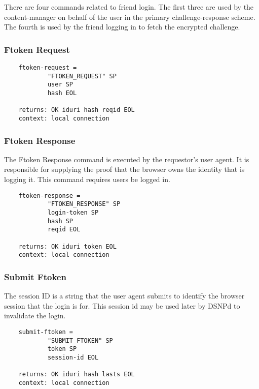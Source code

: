 \documentclass[letterpaper,11pt,oneside]{article}
\begin{document}
There are four commands related to friend login. The first three are used by
the content-manager on behalf of the user in the primary challenge-response
scheme. The fourth is used by the friend logging in to fetch the encrypted
challenge.

\subsubsection{Ftoken Request}

\vspace{10pt}
\begin{verbatim}
    ftoken-request = 
            "FTOKEN_REQUEST" SP 
            user SP 
            hash EOL 

    returns: OK iduri hash reqid EOL
    context: local connection
\end{verbatim}
\vspace{10pt}


\subsubsection{Ftoken Response}

The Ftoken Response command is executed by the requestor's user agent. It is
responsible for supplying the proof that the browser owns the identity that is
logging it. This command requires users be logged in.

\vspace{10pt}
\begin{verbatim}
    ftoken-response = 
            "FTOKEN_RESPONSE" SP 
            login-token SP 
            hash SP 
            reqid EOL 

    returns: OK iduri token EOL
    context: local connection
\end{verbatim}
\vspace{10pt}


\subsubsection{Submit Ftoken}

The session ID is a string that the user agent submits to identify the browser
session that the login is for. This session id may be used later by DSNPd to
invalidate the login.

\vspace{10pt}
\begin{verbatim}
    submit-ftoken = 
            "SUBMIT_FTOKEN" SP 
            token SP 
            session-id EOL 

    returns: OK iduri hash lasts EOL
    context: local connection
\end{verbatim}
\vspace{10pt}
\end{document}
